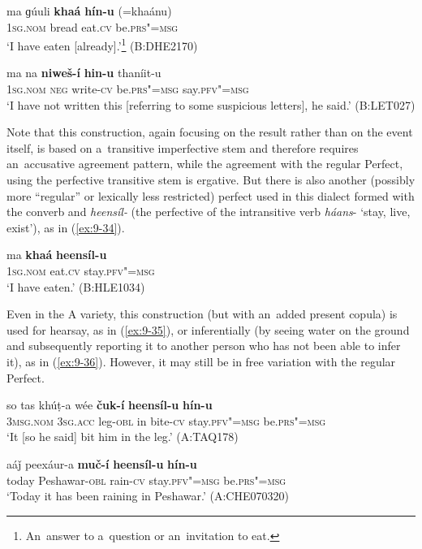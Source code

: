 \begin{exe}
\ex
\label{ex:9-32}
\gll ma ɡúuli \textbf{khaá} \textbf{hín-u} (=khaánu)\\
\textsc{1sg.nom} bread eat.\textsc{cv} be.\textsc{prs"=msg} \\
\glt `I have eaten [already].'\footnote{An~answer to a~question or an~invitation to eat.} (B:DHE2170)

\ex
\label{ex:9-33}
\gll ma na \textbf{niweš-í} \textbf{hin-u} thaníit-u\\
\textsc{1sg.nom} \textsc{neg} write-\textsc{cv} be.\textsc{prs"=msg} say.\textsc{pfv"=msg} \\
\glt `I have not written this [referring to some suspicious letters], he said.' (B:LET027)
\end{exe}

Note that this construction, again focusing on the result rather than on the event itself, is based on a~transitive imperfective stem and therefore requires an~accusative agreement pattern, while the agreement with the regular Perfect, using the perfective transitive stem is ergative. But there is also another (possibly more ``regular'' or lexically less restricted) perfect used in this dialect formed with the converb and \textit{heensíl-} (the perfective of the intransitive verb \textit{háans}- `stay, live, exist'), as in (\ref{ex:9-34}).

\begin{exe}
\ex
\label{ex:9-34}
\gll ma \textbf{khaá} \textbf{heensíl-u}  \\
\textsc{1sg.nom} eat.\textsc{cv} stay.\textsc{pfv"=msg} \\
\glt `I have eaten.' (B:HLE1034)
\end{exe}

Even in the A variety, this construction (but with an~added present copula) is used for hearsay, as in (\ref{ex:9-35}), or inferentially (by seeing water on the ground and subsequently reporting it to another person who has not been able to infer it), as in (\ref{ex:9-36}). However, it may still be in free variation with the regular Perfect.

\begin{exe}
\ex
\label{ex:9-35}
\gll so tas khúṭ-a wée \textbf{čuk-í} \textbf{heensíl-u} \textbf{hín-u} \\
\textsc{3msg.nom} \textsc{3sg.acc} leg-\textsc{obl} in bite-\textsc{cv} stay.\textsc{pfv"=msg} be.\textsc{prs"=msg} \\
\glt `It [so he said] bit him in the leg.' (A:TAQ178)

\ex
\label{ex:9-36}
\gll aáǰ peexáur-a \textbf{muč-í} \textbf{heensíl-u} \textbf{hín-u}  \\
today Peshawar-\textsc{obl} rain-\textsc{cv} stay.\textsc{pfv"=msg} be.\textsc{prs"=msg} \\
\glt `Today it has been raining in Peshawar.' (A:CHE070320)
\end{exe}

